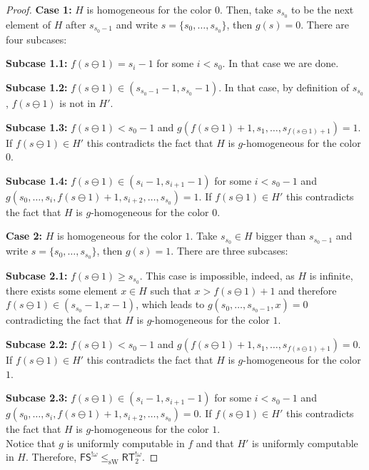 \documentclass{article}
\newcommand{\FS}[0]{\mathsf{FS}}
\newcommand{\RT}[0]{\mathsf{RT}}
\newcommand{\sW}{\mathrm{sW}}
\numberwithin{theorem}{section}
\begin{document}
\begin{proof}
\textbf{Case 1:} $H$ is homogeneous for the color $0$. Then, take $s_{s_0}$ to be the next element of $H$ after $s_{s_0 - 1}$ and write $s = \{s_0, \dots, s_{s_0}\}$, then $g(s) = 0$. There are four subcases:

\textbf{Subcase 1.1:} $f(s \ominus 1) = s_i - 1$ for some $i < s_0$. In that case we are done.

\textbf{Subcase 1.2:} $f(s \ominus 1) \in (s_{s_0 - 1} - 1, s_{s_0} - 1)$. In that case, by definition of $s_{s_0}$, $f(s \ominus 1)$ is not in $H'$.

\textbf{Subcase 1.3:} $f(s \ominus 1) < s_0 - 1$ and $g(f(s \ominus 1) + 1, s_1, \dots, s_{f(s \ominus 1) + 1}) = 1$. If $f(s \ominus 1) \in H'$ this contradicts the fact that $H$ is $g$-homogeneous for the color $0$. 

\textbf{Subcase 1.4:} $f(s \ominus 1) \in (s_i - 1, s_{i+1} - 1)$ for some $i < s_0 - 1$ and $g(s_0, \dots, s_i, f(s \ominus 1) + 1 ,s_{i+2}, \dots, s_{s_0}) = 1$. If $f(s \ominus 1) \in H'$ this contradicts the fact that $H$ is $g$-homogeneous for the color $0$. 

\textbf{Case 2:} $H$ is homogeneous for the color $1$. Take $s_{s_0} \in H$ bigger than $s_{s_0 - 1}$ and write $s = \{s_0, \dots, s_{s_0}\}$, then $g(s) = 1$. There are three subcases:

\textbf{Subcase 2.1:} $f(s \ominus 1) \geq s_{s_0}$. This case is impossible, indeed, as $H$ is infinite, there exists some element $x \in H$ such that $x > f(s \ominus 1) + 1$ and therefore $f(s \ominus 1) \in (s_{s_0} - 1, x - 1)$, which leads to $g(s_0, \dots, s_{s_0 - 1}, x) = 0$ contradicting the fact that $H$ is $g$-homogeneous for the color $1$.

\textbf{Subcase 2.2:} $f(s \ominus 1) < s_0 - 1$ and $g(f(s \ominus 1) + 1, s_1, \dots, s_{f(s \ominus 1) + 1}) = 0$. If $f(s \ominus 1) \in H'$ this contradicts the fact that $H$ is $g$-homogeneous for the color $1$. 

\textbf{Subcase 2.3:}  $f(s \ominus 1) \in (s_i - 1, s_{i+1} - 1)$ for some $i < s_0 - 1$ and $g(s_0, \dots, s_i, f(s \ominus 1) + 1 ,s_{i+2}, \dots, s_{s_0}) = 0$. If $f(s \ominus 1) \in H'$ this contradicts the fact that $H$ is $g$-homogeneous for the color $1$.  \\

Notice that $g$ is uniformly computable in $f$ and that $H'$ is uniformly computable in $H$. Therefore, $\FS^{!\omega} \leq_{\sW} \RT^{!\omega}_2$.

\end{proof}
\end{document}
